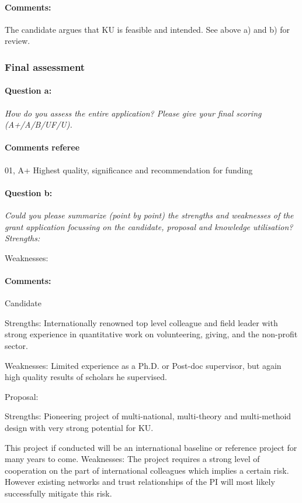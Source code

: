 \documentclass[twocolumn, serif, rga, numeric]{jote-article}
\begin{document}
\paragraph{Comments:}
The candidate argues that KU is feasible and intended. See above a) and b) for review.
 {}\subsubsection*{Final assessment} 
\paragraph{Question a:}
\textit{How do you assess the entire application? Please give your final scoring (A+/A/B/UF/U).}
\paragraph{Comments referee} 
01, A+ Highest quality, significance and recommendation for funding
\paragraph{Question b:}
\textit{Could you please summarize (point by point) the strengths and weaknesses of the grant application focussing on the candidate, proposal and knowledge utilisation? Strengths:}

\noindent Weaknesses:
\paragraph{Comments:}
Candidate

Strengths: Internationally renowned top level colleague and field leader with strong experience in quantitative work on volunteering, giving, and the non-profit sector.

Weaknesses: Limited experience as a Ph.D. or Post-doc supervisor, but again high quality results of scholars he supervised.

\noindent Proposal:

Strengths: Pioneering project of multi-national, multi-theory and multi-methoid design with very strong potential for KU.

This project if conducted will be an international baseline or reference project for many years to come.
Weaknesses: The project requires a strong level of cooperation on the part of international colleagues which implies a certain risk. However existing networks and trust relationships of the PI will most likely successfully mitigate this risk.
\end{document}
